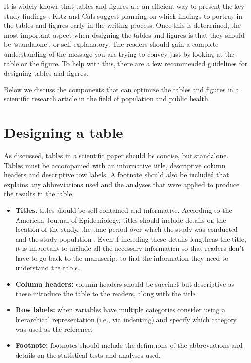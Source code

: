 \documentclass[
]{book}
\providecommand{\tightlist}{%
  \setlength{\itemsep}{0pt}\setlength{\parskip}{0pt}}
\begin{document}
It is widely known that tables and figures are an efficient way to present the key study findings \citep{kotz2013effective4}. Kotz and Cals \citep{kotz2013effective4} suggest planning on which findings to portray in the tables and figures early in the writing process. Once this is determined, the most important aspect when designing the tables and figures is that they should be `standalone', or self-explanatory. The readers should gain a complete understanding of the message you are trying to convey just by looking at the table or the figure. To help with this, there are a few recommended guidelines for designing tables and figures.

Below we discuss the components that can optimize the tables and figures in a scientific research article in the field of population and public health.

\hypertarget{designing-a-table}{%
\section{Designing a table}\label{designing-a-table}}

As discussed, tables in a scientific paper should be concise, but standalone. Tables must be accompanied with an informative title, descriptive column headers and descriptive row labels. A footnote should also be included that explains any abbreviations used and the analyses that were applied to produce the results in the table.

\begin{itemize}
\tightlist
\item
  \textbf{Titles:} titles should be self-contained and informative. According to the American Journal of Epidemiology, titles should include details on the location of the study, the time period over which the study was conducted and the study population \citep{aje2021instructions}. Even if including these details lengthens the title, it is important to include all the necessary information so that readers don't have to go back to the manuscript to find the information they need to understand the table.
\item
  \textbf{Column headers:} column headers should be succinct but descriptive as these introduce the table to the readers, along with the title.
\item
  \textbf{Row labels:} when variables have multiple categories consider using a hierarchical representation (i.e., via indenting) and specify which category was used as the reference.
\item
  \textbf{Footnote:} footnotes should include the definitions of the abbreviations and details on the statistical tests and analyses used.
\end{itemize}
\end{document}
